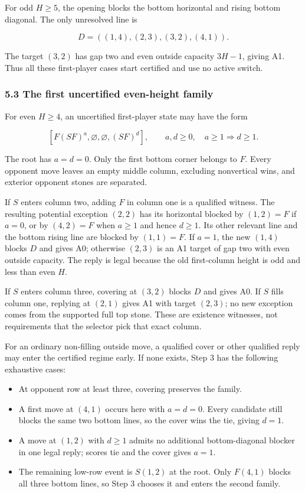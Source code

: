 \documentclass[
  a4paper,
]{article}
\newcounter{none} %
\providecommand{\tightlist}{%
  \setlength{\itemsep}{0pt}\setlength{\parskip}{0pt}}
\begin{document}
For odd \(H\ge5\), the opening blocks the bottom horizontal and rising
bottom diagonal. The only unresolved line is

\[D=((1,4),(2,3),(3,2),(4,1)).\]

The target \((3,2)\) has gap two and even outside capacity \(3H-1\),
giving A1. Thus all these first-player cases start certified and use no
active switch.

\subsubsection{5.3 The first uncertified even-height
family}\label{the-first-uncertified-even-height-family}

For even \(H\ge4\), an uncertified first-player state may have the form

\[[F(SF)^a,\varnothing,\varnothing,(SF)^d],\qquad a,d\ge0,\quad a\ge1\Rightarrow d\ge1.\]

The root has \(a=d=0\). Only the first bottom corner belongs to \(F\).
Every opponent move leaves an empty middle column, excluding nonvertical
wins, and exterior opponent stones are separated.

If \(S\) enters column two, adding \(F\) in column one is a qualified
witness. The resulting potential exception \((2,2)\) has its horizontal
blocked by \((1,2)=F\) if \(a=0\), or by \((4,2)=F\) when \(a\ge1\) and
hence \(d\ge1\). Its other relevant line and the bottom rising line are
blocked by \((1,1)=F\). If \(a=1\), the new \((1,4)\) blocks \(D\) and
gives A0; otherwise \((2,3)\) is an A1 target of gap two with even
outside capacity. The reply is legal because the old first-column height
is odd and less than even \(H\).

If \(S\) enters column three, covering at \((3,2)\) blocks \(D\) and
gives A0. If \(S\) fills column one, replying at \((2,1)\) gives A1 with
target \((2,3)\); no new exception comes from the supported full top
stone. These are existence witnesses, not requirements that the selector
pick that exact column.

For an ordinary non-filling outside move, a qualified cover or other
qualified reply may enter the certified regime early. If none exists,
Step 3 has the following exhaustive cases:

\begin{itemize}
\tightlist
\item
  At opponent row at least three, covering preserves the family.
\item
  A first move at \((4,1)\) occurs here with \(a=d=0\). Every candidate
  still blocks the same two bottom lines, so the cover wins the tie,
  giving \(d=1\).
\item
  A move at \((1,2)\) with \(d\ge1\) admits no additional
  bottom-diagonal blocker in one legal reply; scores tie and the cover
  gives \(a=1\).
\item
  The remaining low-row event is \(S(1,2)\) at the root. Only \(F(4,1)\)
  blocks all three bottom lines, so Step 3 chooses it and enters the
  second family.
\end{itemize}
\end{document}
